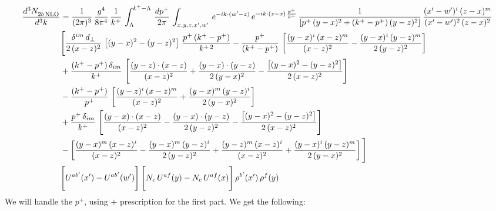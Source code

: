 \documentclass[9pt]{article}
\numberwithin{equation}{section}
\begin{document}
\begin{align}
 \frac{d^{3}N_{2b\,\rm NLO}^{\rm}}{d^{3}k}  & =   \frac{1}{(2\pi)^{3}}\,\frac{g^{4}}{8\pi^{4}}\,\frac{1}{k^{+}}\,\int_{\Lambda}^{k^{+}-\Lambda}\, \frac{dp^{+}}{2\pi} \, \int_{x,y,z,x',w'}\,e^{-ik\cdot(w'-z)}\,e^{-ik\cdot (z-x)\,\frac{p^{+}}{k^{+}}}\,\frac{1}{\left[p^{+}\,(y-x)^{2}+(k^{+}-p^{+})\,(y-z)^{2}\right]}\, \frac{(x'-w')^{i}\,(z-x)^{m}}{(x'-w')^{2}\,(z-x)^{2}} \notag \\ & \Bigg[\frac{\delta^{im}\,d_{\perp}}{2\,(x-z)^{2}}\,\left[(y-x)^{2}-(y-z)^{2}\right]\,\frac{p^{+}\,(k^{+}-p^{+})}{k^{+\,2}}-\frac{p^{+}}{(k^{+}-p^{+})}\,\left[\frac{(y-x)^{i}\,(x-z)^{m}}{(x-z)^{2}}-\frac{(y-x)^{i}\,(y-z)^{m}}{2\,(y-z)^{2}}\right]\notag \\ & +\frac{(k^{+}-p^{+})\,\delta_{im}}{k^{+}}\,\left[\frac{(y-z)\cdot (x-z)}{(x-z)^{2}}+\frac{(y-x)\cdot (y-z)}{2\,(y-x)^{2}}-\frac{\left[(y-x)^{2}-(y-z)^{2}\right]}{2\,(x-z)^{2}}\right]\notag \\ & -\frac{(k^{+}-p^{+})}{p^{+}}\,\left[\frac{(y-z)^{i}\,(x-z)^{m}}{(x-z)^{2}}+\frac{(y-x)^{m}\,(y-z)^{i}}{2\,(y-x)^{2}}\right]\notag \\ & +\frac{p^{+}\,\delta_{im}}{k^{+}}\,\left[\frac{(y-x)\cdot (x-z)}{(x-z)^{2}}-\frac{(y-x)\cdot (y-z)}{2\,(y-z)^{2}}-\frac{\left[(y-x)^{2}-(y-z)^{2}\right]}{2\,(x-z)^{2}}\right]\notag \\ &-\left[\frac{(y-x)^{m}\,(x-z)^{i}}{(x-z)^{2}}-\frac{(y-x)^{m}\,(y-z)^{i}}{2\,(y-z)^{2}}+\frac{(y-z)^{m}\,(x-z)^{i}}{(x-z)^{2}}+\frac{(y-x)^{i}\,(y-z)^{m}}{2\,(y-x)^{2}}\right]\Bigg] \notag \\ & \Bigg[U^{ab'}(x')-U^{ab'}(w')\Bigg]\,\Bigg[N_{c}\,U^{af}(y) -N_{c}\,U^{af}(x)\Bigg]\,\rho^{b'}(x')\,\rho^{f}(y)
\end{align}
We will handle the $p^{+}$, using $+$ prescription for the first part. We get the following: 
\end{document}
